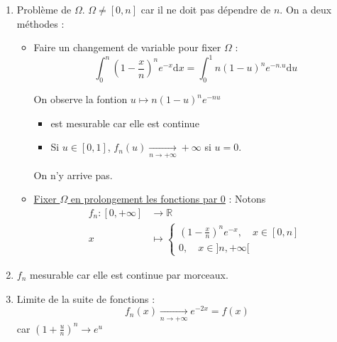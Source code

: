 \begin{solution}
    \begin{enumerate}

      \item Problème de $\Omega$. $\Omega \ne [0, n]$ car il ne doit pas dépendre de $n$. 
        On a deux méthodes : 
        \begin{itemize}
            \item Faire un changement de variable pour fixer $\Omega$ : 
              \begin{equation}
                \int_{0}^{n} \left( 1- \frac{x}{n}  \right) ^{n} e ^{-x} \mathrm{d}x = \int_{0}^{1} n(1-u) ^{n} e 
                ^{-n.u} \mathrm{d}u
              \end{equation}

              On observe la fontion $u \mapsto n(1-u) ^{n} e ^{-nu}$
              \begin{itemize}

                  \item est mesurable car elle est continue 
                  \item Si $u \in [0,1]$, $f_n(u)  \underset{n \to +\infty}{\longrightarrow} + \infty$ si $u=0$. 

              \end{itemize}

              On n'y arrive pas. 




            \item \underline{Fixer $\Omega$ en prolongement les fonctions par 0} : Notons 
        \begin{align}
          f_n : [0, +\infty] &\to \mathbb{R}  \\
          x &\mapsto \begin{cases}
            \left( 1- \frac{x}{n}  \right) ^{n} e ^{-x}, \quad x \in [0, n] \\ 
            0, \quad x \in ]n, + \infty[
          \end{cases}
        \end{align}


        \end{itemize}


      \item $f_n$ mesurable car elle est continue par morceaux.
      \item Limite de la suite de fonctions : 
        \begin{equation}
          f_n(x)  \underset{n \to +\infty}{\longrightarrow} e ^{-2x} = f(x)
        \end{equation}
        car $ \left( 1 + \frac{u}{n}   \right) ^{n} \to e ^{u}$


\end{enumerate}
\end{solution}
